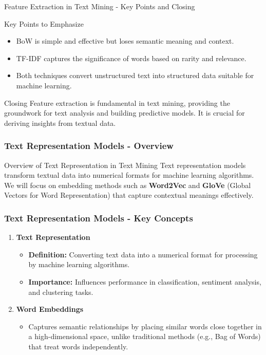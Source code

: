 \documentclass[aspectratio=169]{beamer}
\begin{document}
\begin{frame}[fragile]{Feature Extraction in Text Mining - Key Points and Closing}
  \begin{block}{Key Points to Emphasize}
    \begin{itemize}
      \item BoW is simple and effective but loses semantic meaning and context.
      \item TF-IDF captures the significance of words based on rarity and relevance.
      \item Both techniques convert unstructured text into structured data suitable for machine learning.
    \end{itemize}
  \end{block}

  \begin{block}{Closing}
    Feature extraction is fundamental in text mining, providing the groundwork for text analysis and building predictive models. It is crucial for deriving insights from textual data.
  \end{block}
\end{frame}

\begin{frame}[fragile]
    \frametitle{Text Representation Models - Overview}
    \begin{block}{Overview of Text Representation in Text Mining}
        Text representation models transform textual data into numerical formats for machine learning algorithms. 
        We will focus on embedding methods such as \textbf{Word2Vec} and \textbf{GloVe} (Global Vectors for Word Representation) that capture contextual meanings effectively.
    \end{block}
\end{frame}

\begin{frame}[fragile]
    \frametitle{Text Representation Models - Key Concepts}
    \begin{enumerate}
        \item \textbf{Text Representation}  
            \begin{itemize}
                \item \textbf{Definition:} Converting text data into a numerical format for processing by machine learning algorithms.
                \item \textbf{Importance:} Influences performance in classification, sentiment analysis, and clustering tasks.
            \end{itemize}

        \item \textbf{Word Embeddings}  
            \begin{itemize}
                \item Captures semantic relationships by placing similar words close together in a high-dimensional space, unlike traditional methods (e.g., Bag of Words) that treat words independently.
            \end{itemize}
    \end{enumerate}
\end{frame}
\end{document}
